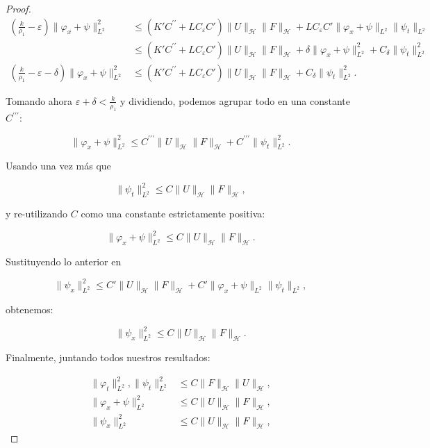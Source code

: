 \begin{proof}
    \begin{align*}
        \left(\frac{k}{\rho_1} - \varepsilon \right)\lVert \varphi_x + \psi \rVert_{L^2}^2 &\leq (K'C^{\prime \prime} + L C_\varepsilon C') \lVert U \rVert_{\mathcal{H}} \lVert F \rVert_{\mathcal{H}}  + L C_\varepsilon C'\lVert \varphi_x + \psi\rVert_{L^2}\lVert \psi_t \rVert_{L^2}\\
        &\leq (K'C^{\prime \prime} + L C_\varepsilon C') \lVert U \rVert_{\mathcal{H}} \lVert F \rVert_{\mathcal{H}}  + \delta \lVert \varphi_x + \psi \rVert_{L^2}^2 + C_\delta \lVert \psi_t \rVert_{L^2}^2\\
        \left(\frac{k}{\rho_1} - \varepsilon - \delta \right)\lVert \varphi_x + \psi \rVert_{L^2}^2 &\leq (K'C^{\prime \prime} + L C_\varepsilon C') \lVert U \rVert_{\mathcal{H}} \lVert F \rVert_{\mathcal{H}} + C_\delta \lVert \psi_t \rVert_{L^2}^2.
    \end{align*}

    Tomando ahora $\varepsilon + \delta < \frac{k}{\rho_1}$ y dividiendo, podemos agrupar todo en una constante $C^{\prime \prime \prime}$:

    \[\lVert \varphi_x + \psi \rVert_{L^2}^2 \leq C^{\prime \prime \prime} \lVert U \rVert_{\mathcal{H}} \lVert F \rVert_{\mathcal{H}} + C^{\prime \prime \prime} \lVert \psi_t \rVert_{L^2}^2.\]

    Usando una vez más que

    \[\lVert \psi_t \rVert_{L^2}^2 \leq C \lVert U \rVert_{\mathcal{H}} \lVert F \rVert_{\mathcal{H}}, \]

    y re-utilizando $C$ como una constante estrictamente positiva:

    \[\lVert \varphi_x + \psi \rVert_{L^2}^2 \leq C\lVert U \rVert_{\mathcal{H}} \lVert F \rVert_{\mathcal{H}}.\]

    Sustituyendo lo anterior en

    \[\lVert \psi_x \rVert_{L^2}^2 \leq C'\lVert U \rVert_{\mathcal{H}} \lVert F \rVert_{\mathcal{H}} + C'\lVert \varphi_x + \psi\rVert_{L^2}\lVert \psi_t \rVert_{L^2},\]

    obtenemos:

    \[\lVert \psi_x \rVert_{L^2}^2 \leq C\lVert U \rVert_{\mathcal{H}} \lVert F \rVert_{\mathcal{H}}.\]
    
    Finalmente, juntando todos nuestros resultados:

    \begin{align*}
        \lVert \varphi_t\rVert^2_{L^2},\lVert \psi_t \rVert^2_{L^2} &\leq C \lVert F \rVert_{\mathcal{H}}\lVert U \rVert_{\mathcal{H}},\\
        \lVert \varphi_x + \psi \rVert_{L^2}^2 &\leq C\lVert U \rVert_{\mathcal{H}} \lVert F \rVert_{\mathcal{H}},\\
        \lVert \psi_x \rVert_{L^2}^2 &\leq C\lVert U \rVert_{\mathcal{H}} \lVert F \rVert_{\mathcal{H}},
    \end{align*}


\end{proof}
